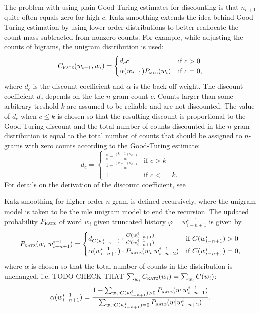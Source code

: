 	The problem with using plain \mbox{Good-Turing} estimates for discounting is that $n_{c+1}$ quite often equals zero for high $c$. Katz smoothing extends the idea behind \mbox{Good-Turing} estimation by using \mbox{lower-order} distributions to better reallocate the count mass subtracted from nonzero counts. For example, while adjusting the counts of bigrams, the unigram distribution is used: 
	\begin{equation}
		C_{\textsc{katz}}(w_{i-1}, w_{i})=
		\begin{cases}
			d_{c}c & \text{if } c>0 \\
			\alpha(w_{i-1})P_{\textsc{mle}}(w_{i}) & \text{if } c=0,
		\end{cases}
	\end{equation}
	where $d_{c}$ is the discount coefficient and $\alpha$ is the back-off weight. The discount coefficient $d_{c}$ depends on the the \mbox{$n$-gram} count $c$. Counts larger than some arbitrary treshold $k$ are assumed to be reliable and are not discounted. The value of $d_{c}$ when $c\leq k$ is chosen so that the resulting discount is proportional to the \mbox{Good-Turing} discount and the total number of counts discounted in the \mbox{$n$-gram} distribution is equal to the total number of counts that should be assigned to \mbox{$n$-grams} with zero counts according to the \mbox{Good-Turing} estimate: 
	\begin{equation}
            d_{c}=
            \begin{cases}
		\frac{\frac{\hat{c}}{c}-\frac{(k+1)n_{k+1}}{n_{1}}}{1-\frac{(k+1)n_{k+1}}{n_{1}}} & \text{if } c > k\\
                1 & \text{if } c <= k.
		\label{equation:dc}
            \end{cases}
	\end{equation}
	For details on the derivation of the discount coefficient, see \cite{chen1996empirical}.

Katz smoothing for higher-order \mbox{$n$-gram} is defined recursively, where the unigram model is taken to be the \gls{mle} unigram model to end the recursion. The updated probability $P_{\textsc{katz}}$ of word $w_{i}$ given truncated history $\varphi=w_{i-n+1}^{i-1}$ is given by
	\begin{equation}
		P_{\textsc{katz}}(w_{i}|w_{i-n+1}^{i-1})=
		\begin{cases}
			d_{C(w_{i-n+1}^{i})}\cdot \frac{C(w_{i-n+1}^{i})}{C(w_{i-n+1}^{i-1})}& \text{if } C(w_{i-n+1}^{i})>0\\
			\alpha(w_{i-n+1}^{i-1})\cdot P_{\textsc{katz}}(w_{i}|w_{i-n+2}^{i-1})& \text{if } C(w_{i-n+1}^{i})=0,
		\end{cases}
	\end{equation}
	where $\alpha$ is chosen so that the total number of counts in the distribution is unchanged, i.e. TODO CHECK THAT $\sum_{w_{i}}C_{\textsc{katz}}(w_{i})=\sum_{w_{i}}C(w_{i})$:
	\begin{equation}
		\alpha(w_{i-n+1}^{i-1})=\frac{1-\sum_{w_{i}:C(w_{i-n+1}^{i})>0}P_{\textsc{katz}}(w|w_{i-n+1}^{i-1})}{\sum_{w_{i}:C(w_{i-n+1}^{i})=0}P_{\textsc{katz}}(w|w_{i-n+2}^{i})}.
	\end{equation}
